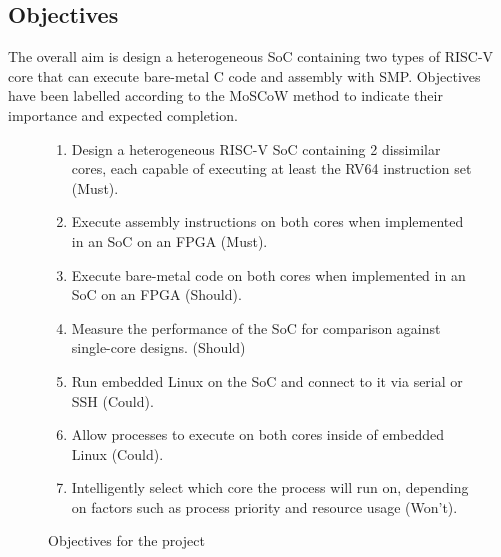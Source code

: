 \subsection{Objectives}
The overall aim is design a heterogeneous SoC containing two types of RISC-V core that can execute bare-metal C code and assembly with SMP. Objectives have been labelled according to the MoSCoW method\cite{case-method-fasttrack} to indicate their importance and expected completion.
\begin{figure}[h!]
    \centering
    \begin{enumerate}
        \item Design a heterogeneous RISC-V SoC containing 2 dissimilar cores, each capable of executing at least the RV64 instruction set (Must).
        \item Execute assembly instructions on both cores when implemented in an SoC on an FPGA (Must).
        \item Execute bare-metal code on both cores when implemented in an SoC on an FPGA (Should).
        \item Measure the performance of the SoC for comparison against single-core designs. (Should)
        \item Run embedded Linux on the SoC and connect to it via serial or SSH (Could).
        \item Allow processes to execute on both cores inside of embedded Linux (Could).
        \item Intelligently select which core the process will run on, depending on factors such as process priority and resource usage (Won't).
    \end{enumerate}
    \caption{Objectives for the project}
    \label{fig:objectives}
\end{figure}
